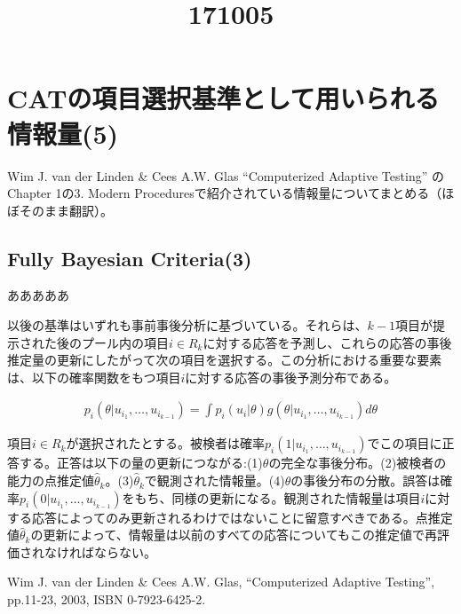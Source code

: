 \documentclass[a4j]{jarticle}
\date{}
\title{171005}
\begin{document}
\maketitle

\section{CATの項目選択基準として用いられる情報量(5)}
Wim J. van der Linden \& Cees A.W. Glas ``Computerized Adaptive Testing'' \cite{b1}のChapter 1の3. Modern Proceduresで紹介されている情報量についてまとめる（ほぼそのまま翻訳）。

\subsection{Fully Bayesian Criteria(3)}
あああああ




以後の基準はいずれも事前事後分析に基づいている。それらは、$k-1$項目が提示された後のプール内の項目$i\in R_{k}$に対する応答を予測し、これらの応答の事後推定量の更新にしたがって次の項目を選択する。この分析における重要な要素は、以下の確率関数をもつ項目$i$に対する応答の事後予測分布である。

\begin{eqnarray}
  \label{e1}
  p_{i}(\theta|u_{i_{1}},\ldots,u_{i_{k-1}}) = \int p_{i}(u_{i}|\theta)g(\theta|u_{i_{1}},\ldots,u_{i_{k-1}})d\theta
\end{eqnarray}

項目$i\in R_{k}$が選択されたとする。被検者は確率$p_{i}(1|u_{i_{1}},\ldots,u_{i_{k-1}})$でこの項目に正答する。正答は以下の量の更新につながる:(1)$\theta$の完全な事後分布。(2)被検者の能力の点推定値$\hat{\theta}_{k}$。(3)$\hat{\theta}_{k}$で観測された情報量。(4)$\theta$の事後分布の分散。誤答は確率$p_{i}(0|u_{i_{1}},\ldots,u_{i_{k-1}})$をもち、同様の更新になる。観測された情報量は項目$i$に対する応答によってのみ更新されるわけではないことに留意すべきである。点推定値$\hat{\theta}_{k}$の更新によって、情報量は以前のすべての応答についてもこの推定値で再評価されなければならない。

\begin{thebibliography}{9}
   Wim J. van der Linden \& Cees A.W. Glas, ``Computerized Adaptive Testing'', pp.11-23, 2003, ISBN 0-7923-6425-2.
\end{thebibliography}
\end{document}
